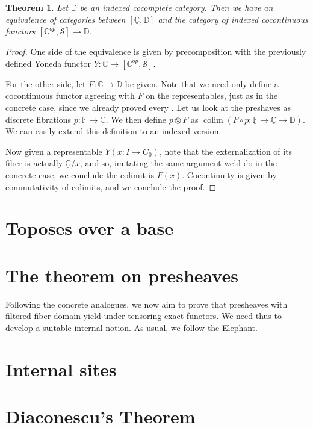 \documentclass[10pt, oneside]{article}
\newtheorem{theorem}{Theorem}[section]
\begin{document}
\begin{theorem}
    Let $\mathbb{D}$ be an indexed cocomplete category. Then we have an equivalence of categories between $[\underline{\mathbb{C}}, \mathbb{D}]$ and the category of indexed cocontinuous functors $[\mathbb{C}^{op}, \mathcal{S}] \to \mathbb{D}$.
\end{theorem}
\begin{proof}
    One side of the equivalence is given by precomposition with the previously defined Yoneda functor $Y: \mathbb{C} \to [\mathbb{C}^{op}, \mathcal{S}]$.

    For the other side, let $F: \underline{\mathbb{C}} \to \mathbb{D}$ be given. Note that we need only define a cocontinuous functor agreeing with $F$ on the representables, just as in the concrete case, since we already proved every . Let us look at the preshaves as discrete fibrations $p: \mathbb{F} \to \mathbb{C}$. We then define $p \otimes F$ as $\operatorname{colim}(F \circ p: \underline{\mathbb{F}} \to \underline{\mathbb{C}} \to \mathbb{D})$. We can easily extend this definition to an indexed version.

    Now given a representable $Y(x: I \to C_0)$, note that the externalization of its fiber is actually $\underline{\mathbb{C}}/x$, and so, imitating the same argument we'd do in the concrete case, we conclude the colimit is $F(x)$. Cocontinuity is given by commutativity of colimits, and we conclude the proof.
\end{proof}

\section{Toposes over a base}

\section{The theorem on presheaves}

Following the concrete analogues, we now aim to prove that presheaves with filtered fiber domain yield under tensoring exact functors. We need thus to develop a suitable internal notion. As usual, we follow the Elephant.



\section{Internal sites}

\section{Diaconescu's Theorem}

\nocite{*}
\printbibliography
\end{document}
